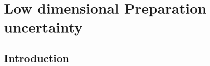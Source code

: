 \let\textcircled=\pgftextcircled




%




\chapter{Low dimensional Preparation uncertainty}
\label{chap:low_dim_prep}

\section{Introduction}

